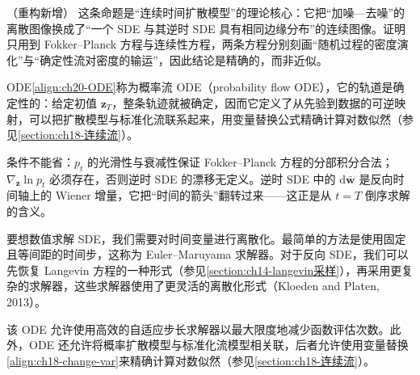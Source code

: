\documentclass[../../main.tex]{subfiles}
\begin{document}
\begin{remark}（重构新增）
这条命题是“连续时间扩散模型”的理论核心：它把“加噪—去噪”的离散图像换成了“一个 SDE 与其逆时 SDE 具有相同边缘分布”的连续图像。证明只用到 Fokker--Planck 方程与连续性方程，两条方程分别刻画“随机过程的密度演化”与“确定性流对密度的输运”，因此结论是精确的，而非近似。\par
ODE\eqref{align:ch20-ODE}称为概率流 ODE（probability flow ODE），它的轨道是确定性的：给定初值 $\bm{z}_T$，整条轨迹就被确定，因而它定义了从先验到数据的可逆映射，可以把扩散模型与标准化流联系起来，用变量替换公式精确计算对数似然（参见\cref{section:ch18-连续流}）。\par
条件不能省：$p_t$ 的光滑性与衰减性保证 Fokker--Planck 方程的分部积分合法；$\nabla_{\bm{z}}\ln p_t$ 必须存在，否则逆时 SDE 的漂移无定义。逆时 SDE 中的 $\mathrm{d}\bar{\bm{w}}$ 是反向时间轴上的 Wiener 增量，它把“时间的箭头”翻转过来——这正是从 $t=T$ 倒序求解的含义。
\end{remark}

要想数值求解 SDE，我们需要对时间变量进行离散化。最简单的方法是使用固定且等间距的时间步，这称为 Euler--Maruyama 求解器。对于反向 SDE，我们可以先恢复 Langevin 方程的一种形式（参见\cref{section:ch14-langevin采样}），再采用更复杂的求解器，这些求解器使用了更灵活的离散化形式（Kloeden and Platen, 2013）。

该 ODE 允许使用高效的自适应步长求解器以最大限度地减少函数评估次数。此外，ODE 还允许将概率扩散模型与标准化流模型相关联，后者允许使用变量替换\eqref{align:ch18-change-var}来精确计算对数似然（参见\cref{section:ch18-连续流}）。
\end{document}

